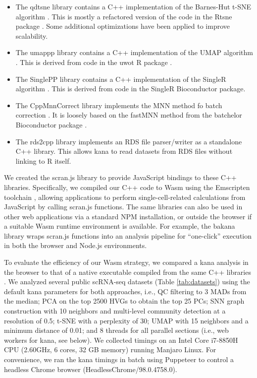 \documentclass{article}
\begin{document}
\begin{itemize}
\item The qdtsne library \cite{qdtsne} contains a C++ implementation of the Barnes-Hut t-SNE algorithm \cite{maaten2014accelerating}.
This is mostly a refactored version of the code in the Rtsne package \cite{rtsne}.
Some additional optimizations have been applied to improve scalability.
\item The umappp library \cite{umappp} contains a C++ implementation of the UMAP algorithm \cite{mcinnes2018umap}.
This is derived from code in the uwot R package \cite{uwot}.
\item The SinglePP library \cite {singlepp} contains a C++ implementation of the SingleR algorithm \cite{aran2019reference}.
This is derived from code in the SingleR Bioconductor package. 
\item The CppMnnCorrect library \cite{cppmnncorrect} implements the MNN method fo batch correction \cite{haghverdi2018batch}.
It is loosely based on the fastMNN method from the batchelor Bioconductor package \cite{batchelorbioc}.
\item The rds2cpp library \cite{rds2cpp} implements an RDS file parser/writer as a standalone C++ library.
This allows kana to read datasets from RDS files without linking to R itself. 
\end{itemize}

We created the scran.js library \cite{scran.js} to provide JavaScript bindings to these C++ libraries.
Specifically, we compiled our C++ code to Wasm using the Emscripten toolchain \cite{zakai2011emscripten},
allowing applications to perform single-cell-related calculations from JavaScript by calling scran.js functions. 
The same libraries can also be used in other web applications via a standard NPM installation, 
or outside the browser if a suitable Wasm runtime environment is available.
For example, the bakana library wraps scran.js functions into an analysis pipeline for ``one-click'' execution in both the browser and Node.js environments.

To evaluate the efficiency of our Wasm strategy, 
we compared a kana analysis in the browser to that of a native executable compiled from the same C++ libraries \cite{scrancli}.
We analyzed several public scRNA-seq datasets (Table \ref{tab:datasets}) using the default kana parameters for both approaches, i.e.,
QC filtering to 3 MADs from the median;
PCA on the top 2500 HVGs to obtain the top 25 PCs;
SNN graph construction with 10 neighbors and multi-level community detection at a resolution of 0.5;
t-SNE with a perplexity of 30;
UMAP with 15 neighbors and a minimum distance of 0.01;
and 8 threads for all parallel sections (i.e., web workers for kana, see below).
We collected timings on an Intel Core i7-8850H CPU (2.60GHz, 6 cores, 32 GB memory) running Manjaro Linux.
For convenience, we ran the kana timings in batch using Puppeteer \cite{puppeteer} to control a headless Chrome browser (HeadlessChrome/98.0.4758.0). 
\end{document}
